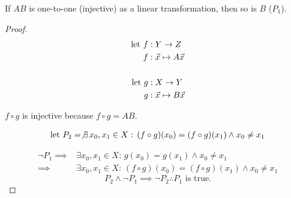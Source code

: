 \begin{question}

	If $AB$ is one-to-one (injective) as a linear transformation, then so is $B$ ($P_1$).


	\begin{proof}


		$$
			\begin{align*}
				{\text{let } } f & : Y       \to 	 Z                 \\
				f       & : \vec x  \mapsto 	 A\vec x       \\
				\\
				{\text{let } } g & : X       \to 	 Y                 \\
				g       & : \vec x        \mapsto 	 B\vec x
			\end{align*}
		$$

		$f\circ g$ is injective because $f\circ g = AB$.

		$$
			\begin{align*}
				{\text{let } } P_{2}	 =		\not\exists\, x_0, x_1\in X : \, (f\circ g)(x_0) = (f\circ g)(x_1) \wedge x_0 \neq x_1
			\end{align*}
		$$

		\begin{align*}
			\neg P_1  \implies & \exists x_0, x_1 \in X  : \, g(x_0)           = g(x_1) \wedge x_0 \neq x_1                       \\
			\implies           & \exists x_0,x_1\in X                 : \, (f\circ g)(x_0)  = (f\circ g)(x_1) \wedge x_0 \neq x_1
		\end{align*}
		$$ P_2 \wedge	\neg P_1 \implies  \neg P_2 \therefore P_1 \text{ is true.} $$
	\end{proof}
\end{question}
